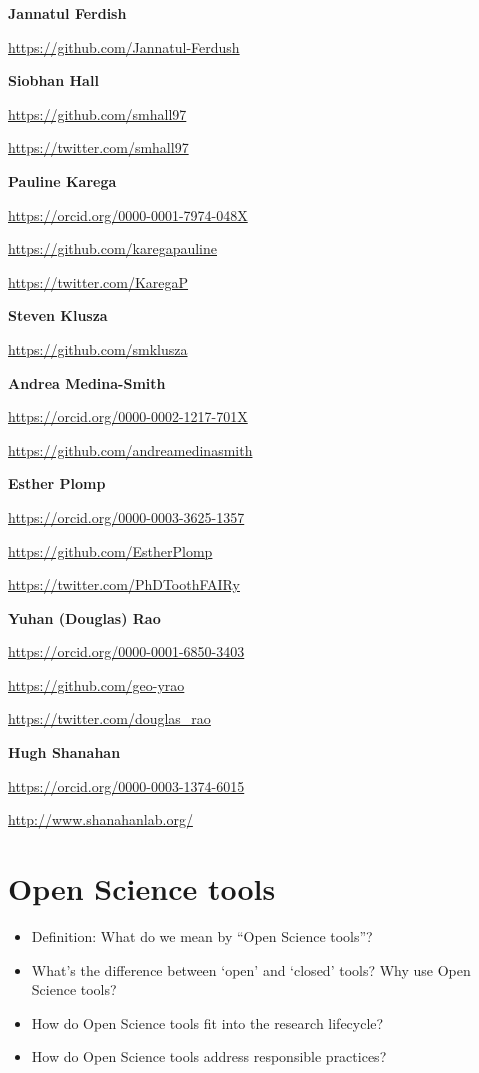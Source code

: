 \documentclass[
  letterpaper,
  DIV=11,
  numbers=noendperiod]{scrreport}
\providecommand{\tightlist}{%
  \setlength{\itemsep}{0pt}\setlength{\parskip}{0pt}}\usepackage{longtable,booktabs,array}
\begin{document}
\textbf{Jannatul Ferdish}

\url{https://github.com/Jannatul-Ferdush}

\textbf{Siobhan Hall}

\url{https://github.com/smhall97}

\url{https://twitter.com/smhall97}

\textbf{Pauline Karega}

\url{https://orcid.org/0000-0001-7974-048X}

\url{https://github.com/karegapauline}

\url{https://twitter.com/KaregaP}

\textbf{Steven Klusza}

\url{https://github.com/smklusza}

\textbf{Andrea Medina-Smith}

\url{https://orcid.org/0000-0002-1217-701X}

\url{https://github.com/andreamedinasmith}

\textbf{Esther Plomp}

\url{https://orcid.org/0000-0003-3625-1357}

\url{https://github.com/EstherPlomp}

\url{https://twitter.com/PhDToothFAIRy}

\textbf{Yuhan (Douglas) Rao}

\url{https://orcid.org/0000-0001-6850-3403}

\url{https://github.com/geo-yrao}

\url{https://twitter.com/douglas_rao}

\textbf{Hugh Shanahan}

\url{https://orcid.org/0000-0003-1374-6015}

\url{http://www.shanahanlab.org/}

\part{Open Science tools}

\begin{itemize}
\tightlist
\item
  Definition: What do we mean by ``Open Science tools''?
\item
  What's the difference between `open' and `closed' tools? Why use Open
  Science tools?
\item
  How do Open Science tools fit into the research lifecycle?
\item
  How do Open Science tools address responsible practices?
\end{itemize}
\end{document}
